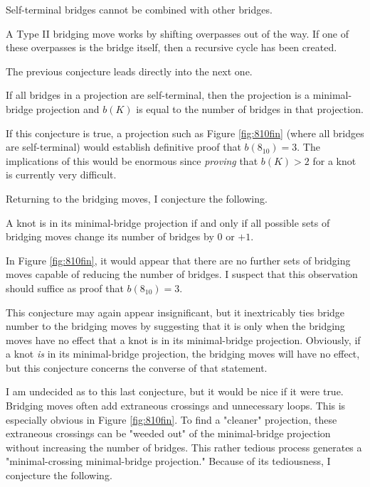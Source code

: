 \documentclass[titlepage]{article}
\begin{document}
\begin{conj}
    Self-terminal bridges cannot be combined with other bridges.
\end{conj}

A Type II bridging move works by shifting overpasses out of the way. If one of these overpasses is the bridge itself, then a recursive cycle has been created.\par
The previous conjecture leads directly into the next one.

\begin{conj}
    If all bridges in a projection are self-terminal, then the projection is a minimal-bridge projection and $b(K)$ is equal to the number of bridges in that projection.
\end{conj}

If this conjecture is true, a projection such as Figure \ref{fig:810fin} (where all bridges are self-terminal) would establish definitive proof that $b(8_{10})=3$. The implications of this would be enormous since \emph{proving} that $b(K)>2$ for a knot is currently very difficult.\par
Returning to the bridging moves, I conjecture the following.

\begin{conj}
    A knot is in its minimal-bridge projection if and only if all possible sets of bridging moves change its number of bridges by $0$ or $+1$.
\end{conj}

In Figure \ref{fig:810fin}, it would appear that there are no further sets of bridging moves capable of reducing the number of bridges. I suspect that this observation should suffice as proof that $b(8_{10})=3$.\par
This conjecture may again appear insignificant, but it inextricably ties bridge number to the bridging moves by suggesting that it is only when the bridging moves have no effect that a knot is in its minimal-bridge projection. Obviously, if a knot \emph{is} in its minimal-bridge projection, the bridging moves will have no effect, but this conjecture concerns the converse of that statement.\par
I am undecided as to this last conjecture, but it would be nice if it were true. Bridging moves often add extraneous crossings and unnecessary loops. This is especially obvious in Figure \ref{fig:810fin}. To find a "cleaner" projection, these extraneous crossings can be "weeded out" of the minimal-bridge projection without increasing the number of bridges. This rather tedious process generates a "minimal-crossing minimal-bridge projection." Because of its tediousness, I conjecture the following.
\end{document}
